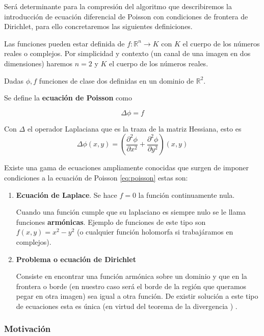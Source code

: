 \documentclass[11pt,twoside,titlepage,a4paper]{article}
\numberwithin{equation}{section} %
\theoremstyle{usual}
\begin{document}
Será determinante para la compresión del algoritmo que describiremos la introducción de ecuación diferencial de Poisson con condiciones de  frontera de Dirichlet, para ello concretaremos las siguientes definiciones. 


 Las funciones pueden estar definida de $ f: \mathbb R^n \longrightarrow K$ con $K$ el cuerpo de los números reales o complejos. Por simplicidad y contexto (un canal de una imagen en dos dimensiones) haremos $n=2$ y $K$ el cuerpo de los números reales. 

Dadas $\phi , f$ funciones de clase dos definidas en un dominio de $\mathbb{R}^2$.   

Se define la \textbf{ecuación de Poisson} como 

\begin{equation}\label{eq:poisson}
    \Delta \phi = f
\end{equation}

Con $\Delta$ el operador Laplaciana que es la traza de la matriz Hessiana, esto es 
$$ \Delta \phi(x,y) = (\frac{\partial ^ 2 \phi}{\partial x^2} + \frac{\partial ^ 2 \phi}{\partial y^2} )(x,y)$$  


Existe una gama de ecuaciones ampliamente conocidas que surgen de imponer condiciones a la ecuación de Poisson \ref{eq:poisson} estas son:   

\begin{enumerate}
    \item 

 \textbf{Ecuación de Laplace}. Se hace $f=0$ la función continuamente nula.   

Cuando una función cumple que su laplaciano es siempre nulo se  le llama funciones \textbf{armónicas}. Ejemplo de funciones de este tipo son 
$f(x,y) = x^2 - y^2$ (o cualquier función holomorfa si trabajáramos en complejos).  

\item \textbf{Problema o ecuación de Dirichlet}   

Consiste en encontrar una función armónica sobre un dominio y que en la frontera o borde (en nuestro caso será el borde de la región que queramos pegar en otra imagen) sea igual a otra función.   
De existir solución a este tipo de ecuaciones esta es única (en virtud del teorema de la divergencia \cite{unicityDirichletProblem}) . 
\end{enumerate}
 


\subsubsection{Motivación }
\end{document}
